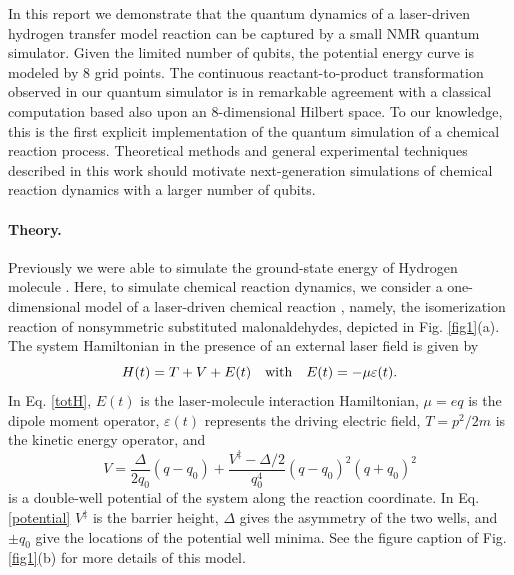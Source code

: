 \documentclass[twocolumn,showpacs,twoside,10pt,prl]{revtex4}
\newcommand{\be}{\begin{equation}}
\newcommand{\ee}{\end{equation}}
\begin{document}
In this report we demonstrate that the quantum dynamics
of a laser-driven hydrogen transfer model reaction can be captured by
a small NMR quantum simulator.
Given the limited number of qubits, the potential energy curve is modeled by 8 grid points.
The continuous reactant-to-product transformation observed in our quantum simulator is in remarkable agreement
with a classical computation based also upon an 8-dimensional Hilbert space.
To our knowledge, this is the first explicit implementation
of the quantum simulation of a chemical reaction process.  Theoretical methods and general experimental techniques described in this work should motivate
next-generation simulations of chemical reaction dynamics with a larger number of qubits.


\paragraph*{Theory.}

Previously we were able to simulate the ground-state energy of Hydrogen molecule \cite{static_exp2}.
Here, to simulate chemical reaction dynamics, we consider a one-dimensional model of a laser-driven chemical reaction \cite{hsubway}, namely,
the isomerization reaction of nonsymmetric substituted malonaldehydes, depicted in Fig. \ref{fig1}(a).
The system Hamiltonian in the presence of
an external laser field is given by
\be\label{totH}
  H(t)=  T+  V+  E(t) { \quad   \rm  with   \quad    }
                            E(t)=- \mu\varepsilon(t).
\ee
In Eq. \ref{totH},  $E(t)$ is the laser-molecule interaction Hamiltonian,
$ \mu=e  q$ is the dipole moment operator,
$\varepsilon(t)$ represents the driving electric field,
$ {T}={  p}^2/2m$ is the kinetic energy operator, and
\be\label{potential}
 {V}=\frac{\Delta}{2q_0}(  q-q_0)+\frac{V^\ddag-\Delta/2}{q_0^4}(  q-q_0)^2(  q+q_0)^2
\ee
is a double-well potential of the system along the reaction coordinate. In Eq. \ref{potential}
$V^\ddag$ is the barrier height, $\Delta$ gives the asymmetry of the two wells, and $\pm q_0$ give the locations of the potential well minima.
See the figure caption of Fig. \ref{fig1}(b) for more details of this model.
\end{document}
